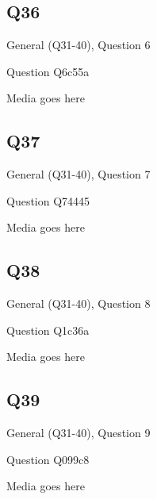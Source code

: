 \documentclass[11pt]{beamer}
\begin{document}
\subsection*{Q36}
\begin{frame}[t]{General (Q31-40), Question 6}
\vspace{2em}
\begin{block}{Question}
Q6c55a
\end{block}
\begin{center}
Media goes here
\end{center}
\end{frame}
    

\subsection*{Q37}
\begin{frame}[t]{General (Q31-40), Question 7}
\vspace{2em}
\begin{block}{Question}
Q74445
\end{block}
\begin{center}
Media goes here
\end{center}
\end{frame}
    

\subsection*{Q38}
\begin{frame}[t]{General (Q31-40), Question 8}
\vspace{2em}
\begin{block}{Question}
Q1c36a
\end{block}
\begin{center}
Media goes here
\end{center}
\end{frame}
    

\subsection*{Q39}
\begin{frame}[t]{General (Q31-40), Question 9}
\vspace{2em}
\begin{block}{Question}
Q099c8
\end{block}
\begin{center}
Media goes here
\end{center}
\end{frame}
    
\end{document}
